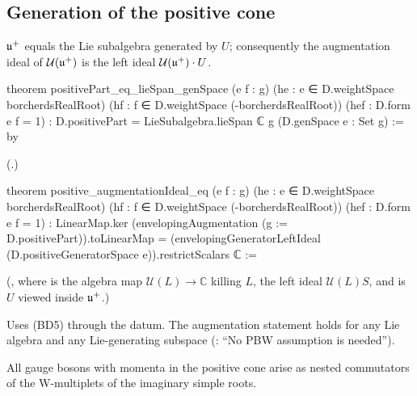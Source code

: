 \subsection{Generation of the positive cone}

\begin{theorem}\label{ch18:thm:generation}
$\mathfrak{u}^+$ equals the Lie subalgebra generated by $U$; consequently the augmentation ideal of $\mathcal U(\mathfrak{u}^+)$ is the left ideal
$\mathcal U(\mathfrak{u}^+)\cdot U$.
\end{theorem}
\begin{leancode}
theorem positivePart_eq_lieSpan_genSpace (e f : g)
    (he : e ∈ D.weightSpace borcherdsRealRoot)
    (hf : f ∈ D.weightSpace (-borcherdsRealRoot)) (hef : D.form e f = 1) :
    D.positivePart = LieSubalgebra.lieSpan ℂ g (D.genSpace e : Set g) := by
\end{leancode}
(.)
\begin{leancode}
theorem positive_augmentationIdeal_eq (e f : g)
    (he : e ∈ D.weightSpace borcherdsRealRoot)
    (hf : f ∈ D.weightSpace (-borcherdsRealRoot)) (hef : D.form e f = 1) :
    LinearMap.ker (envelopingAugmentation (g := D.positivePart)).toLinearMap =
      (envelopingGeneratorLeftIdeal (D.positiveGeneratorSpace e)).restrictScalars ℂ :=
\end{leancode}
(, where  is the algebra map
$\mathcal U(L)\to\mathbb C$ killing $L$,  the left ideal $\mathcal U(L)S$, and
 is $U$ viewed inside $\mathfrak{u}^+$.)
\begin{dictionary}
Uses (BD5) through the datum.  The augmentation statement holds for any Lie algebra and any Lie-generating subspace
(: ``No PBW assumption is needed'').
\end{dictionary}
\begin{physics}All gauge bosons with momenta in the positive cone arise as nested commutators of the W-multiplets of the imaginary simple roots.\end{physics}
